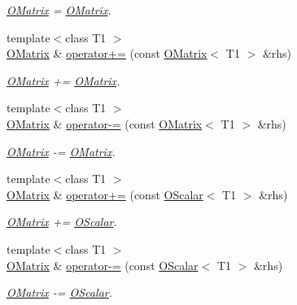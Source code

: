 \begin{DoxyCompactItemize}
\begin{DoxyCompactList}\small\item\em \mbox{\hyperlink{classENSEM_1_1OMatrix}{O\+Matrix}} = \mbox{\hyperlink{classENSEM_1_1OMatrix}{O\+Matrix}}. \end{DoxyCompactList}\item 
{\footnotesize template$<$class T1 $>$ }\\\mbox{\hyperlink{classENSEM_1_1OMatrix}{O\+Matrix}} \& \mbox{\hyperlink{classENSEM_1_1OMatrix_a221eb5f9e17402ad93c829fcaf2ac60a}{operator+=}} (const \mbox{\hyperlink{classENSEM_1_1OMatrix}{O\+Matrix}}$<$ T1 $>$ \&rhs)
\begin{DoxyCompactList}\small\item\em \mbox{\hyperlink{classENSEM_1_1OMatrix}{O\+Matrix}} += \mbox{\hyperlink{classENSEM_1_1OMatrix}{O\+Matrix}}. \end{DoxyCompactList}\item 
{\footnotesize template$<$class T1 $>$ }\\\mbox{\hyperlink{classENSEM_1_1OMatrix}{O\+Matrix}} \& \mbox{\hyperlink{classENSEM_1_1OMatrix_a4c9bcdd861f4439d1b165ec5285cf55f}{operator-\/=}} (const \mbox{\hyperlink{classENSEM_1_1OMatrix}{O\+Matrix}}$<$ T1 $>$ \&rhs)
\begin{DoxyCompactList}\small\item\em \mbox{\hyperlink{classENSEM_1_1OMatrix}{O\+Matrix}} -\/= \mbox{\hyperlink{classENSEM_1_1OMatrix}{O\+Matrix}}. \end{DoxyCompactList}\item 
{\footnotesize template$<$class T1 $>$ }\\\mbox{\hyperlink{classENSEM_1_1OMatrix}{O\+Matrix}} \& \mbox{\hyperlink{classENSEM_1_1OMatrix_ab488697fd72f3891fede3d00f8deb019}{operator+=}} (const \mbox{\hyperlink{classENSEM_1_1OScalar}{O\+Scalar}}$<$ T1 $>$ \&rhs)
\begin{DoxyCompactList}\small\item\em \mbox{\hyperlink{classENSEM_1_1OMatrix}{O\+Matrix}} += \mbox{\hyperlink{classENSEM_1_1OScalar}{O\+Scalar}}. \end{DoxyCompactList}\item 
{\footnotesize template$<$class T1 $>$ }\\\mbox{\hyperlink{classENSEM_1_1OMatrix}{O\+Matrix}} \& \mbox{\hyperlink{classENSEM_1_1OMatrix_a53a1a690a2f39f0c64c6d261efc00e4c}{operator-\/=}} (const \mbox{\hyperlink{classENSEM_1_1OScalar}{O\+Scalar}}$<$ T1 $>$ \&rhs)
\begin{DoxyCompactList}\small\item\em \mbox{\hyperlink{classENSEM_1_1OMatrix}{O\+Matrix}} -\/= \mbox{\hyperlink{classENSEM_1_1OScalar}{O\+Scalar}}. \end{DoxyCompactList}\item 

\end{DoxyCompactItemize}
